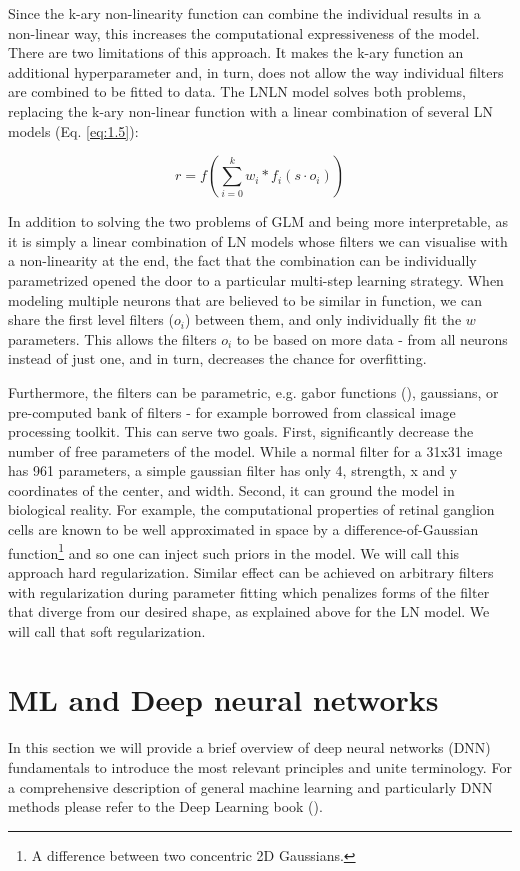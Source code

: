 Since the k-ary non-linearity function can combine the individual results in a non-linear way, this increases the computational expressiveness of the model. There are two limitations of this approach. It makes the k-ary function an additional hyperparameter and, in turn, does not allow the way individual filters are combined to be fitted to data. The LNLN model solves both problems, replacing the k-ary non-linear function with a linear combination of several LN models (Eq. \ref{eq:1.5}):

\begin{equation}\label{eq:1.5}
    r = f(\sum_{i=0}^{k} w_i * f_i(s \cdot o_i))
\end{equation}

In addition to solving the two problems of GLM and being more interpretable, as it is simply a linear combination of LN models whose filters we can visualise with a non-linearity at the end, the fact that the combination can be individually parametrized opened the door to a particular multi-step learning strategy. When modeling multiple neurons that are believed to be similar in function, we can share the first level filters ($o_i$) between them, and only individually fit the $w$ parameters. This allows the filters $o_i$ to be based on more data - from all neurons instead of just one, and in turn, decreases the chance for overfitting.

Furthermore, the filters can be parametric, e.g. gabor functions (\cite{Kay2008}), gaussians, or pre-computed bank of filters - for example borrowed from classical image processing toolkit. This can serve two goals. First, significantly decrease the number of free parameters of the model. While a normal filter for a 31x31 image has 961 parameters, a simple gaussian filter has only 4, strength, x and y coordinates of the center, and width. Second, it can ground the model in biological reality. For example, the computational properties of retinal ganglion cells are known to be well approximated in space by a difference-of-Gaussian function\footnote{A difference between two concentric 2D Gaussians.} and so one can inject such priors in the model. We will call this approach hard regularization. Similar effect can be achieved on arbitrary filters with regularization during parameter fitting which penalizes forms of the filter that diverge from our desired shape, as explained above for the LN model. We will call that soft regularization.

\section{ML and Deep neural networks}
In this section we will provide a brief overview of deep neural networks (DNN) fundamentals to introduce the most relevant principles and unite terminology. For a comprehensive description of general machine learning and particularly DNN methods please refer to the Deep Learning book (\cite{Goodfellow-et-al-2016}).

